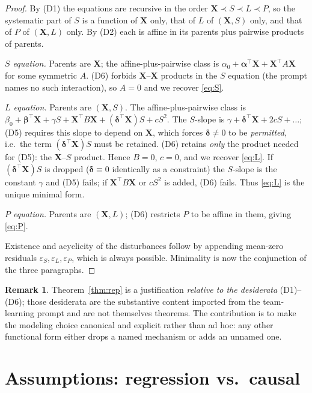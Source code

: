 \documentclass{amsart}
\theoremstyle{definition}
\newtheorem{remark}{Remark}
\theoremstyle{plain}
\begin{document}
\begin{proof}
By (D1) the equations are recursive in the order $\bm X\prec S\prec L\prec P$, so the
systematic part of $S$ is a function of $\bm X$ only, that of $L$ of $(\bm X,S)$ only, and
that of $P$ of $(\bm X,L)$ only. By (D2) each is affine in its parents plus pairwise
products of parents.

\emph{$S$ equation.} Parents are $\bm X$; the affine-plus-pairwise class is
$\alpha_0+\bm\alpha^\top\bm X+\bm X^\top A\bm X$ for some symmetric $A$. (D6) forbids
$\bm X$--$\bm X$ products in the $S$ equation (the prompt names no such interaction), so
$A=0$ and we recover \eqref{eq:S}.

\emph{$L$ equation.} Parents are $(\bm X,S)$. The affine-plus-pairwise class is
$\beta_0+\bm\beta^\top\bm X+\gamma S+\bm X^\top B\bm X+(\bm\delta^\top\bm X)S+ cS^2$. The
$S$-slope is $\gamma+\bm\delta^\top\bm X+2cS+\dots$; (D5) requires this slope to depend on
$\bm X$, which forces $\bm\delta\neq0$ to be \emph{permitted}, i.e.\ the term
$(\bm\delta^\top\bm X)S$ must be retained. (D6) retains \emph{only} the product needed for
(D5): the $\bm X$--$S$ product. Hence $B=0$, $c=0$, and we recover \eqref{eq:L}. If
$(\bm\delta^\top\bm X)S$ is dropped ($\bm\delta\equiv0$ identically as a constraint) the
$S$-slope is the constant $\gamma$ and (D5) fails; if $\bm X^\top B\bm X$ or $cS^2$ is added,
(D6) fails. Thus \eqref{eq:L} is the unique minimal form.

\emph{$P$ equation.} Parents are $(\bm X,L)$; (D6) restricts $P$ to be affine in them,
giving \eqref{eq:P}.

Existence and acyclicity of the disturbances follow by appending mean-zero residuals
$\varepsilon_S,\varepsilon_L,\varepsilon_P$, which is always possible. Minimality is now the
conjunction of the three paragraphs.
\end{proof}

\begin{remark}
Theorem~\ref{thm:rep} is a justification \emph{relative to the desiderata} (D1)--(D6); those
desiderata are the substantive content imported from the team-learning prompt and are not
themselves theorems. The contribution is to make the modeling choice canonical and explicit
rather than ad hoc: any other functional form either drops a named mechanism or adds an
unnamed one.
\end{remark}

\section{Assumptions: regression vs.\ causal}
\end{document}
